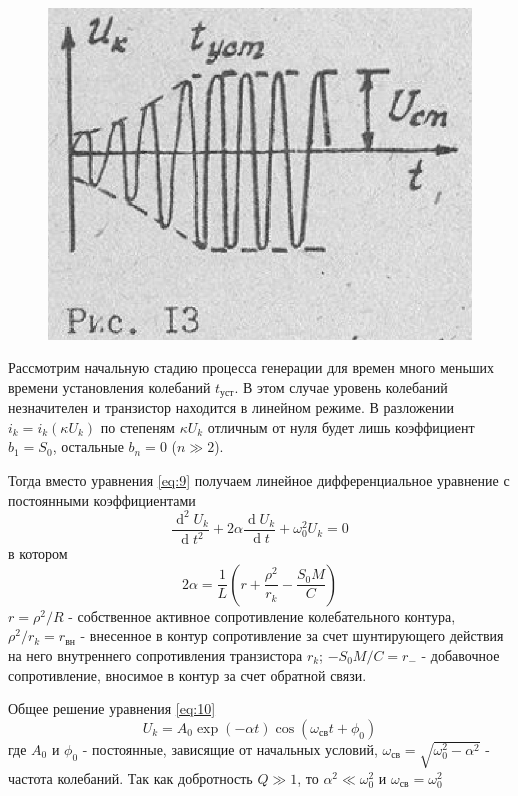 \begin{figure}
\includegraphics[width=\linewidth]{circuit/13.jpg}
\caption{}
\label{fig:figure13}
\vspace{-20pt}
\end{figure}

Рассмотрим начальную стадию процесса генерации для времен много меньших времени установления колебаний $t_\text{уст}$. В этом случае уровень колебаний незначителен и транзистор находится в линейном режиме. В разложении $i_k=i_k(\kappa U_k)$ по степеням $\kappa U_k$ отличным от нуля будет лишь коэффициент $b_1=S_0$, остальные $b_n=0$ ($n\gg2$).

Тогда вместо уравнения \eqref{eq:9} получаем линейное дифференциальное уравнение с постоянными коэффициентами
\begin{equation}
\frac{\operatorname d^2U_k}{\operatorname dt^2}+2\alpha \frac{\operatorname d U_k}{\operatorname dt}+\omega_0^2U_k=0
\label{eq:10}
\end{equation}
в котором
\begin{equation}
2\alpha=\frac{1}{L}(r+\frac{\rho^2}{r_k}-\frac{S_0M}{C})
\label{eq:11}
\end{equation}
$\displaystyle r=\rho^2/R$ - собственное активное сопротивление колебательного контура, $\displaystyle \rho^2/r_k=r_\text{вн}$ - внесенное в контур сопротивление за счет шунтирующего действия на него внутреннего сопротивления транзистора $r_k$; $-S_0M/C=r_{-}$ - добавочное сопротивление, вносимое в контур за счет обратной связи. 

Общее решение уравнения \eqref{eq:10}
\begin{equation*}
U_k=A_0\exp(-\alpha t)\cos(\omega_\text{св}t+\phi_0)
\end{equation*}
где $A_0$ и $\phi_0$ - постоянные, зависящие от начальных условий, $\omega_\text{св}=\sqrt{\omega_0^2-\alpha^2}$ - частота колебаний. Так как добротность $Q\gg1$, то $\alpha^2\ll \omega_0^2$ и $\omega_\text{св}=\omega_0^2$

